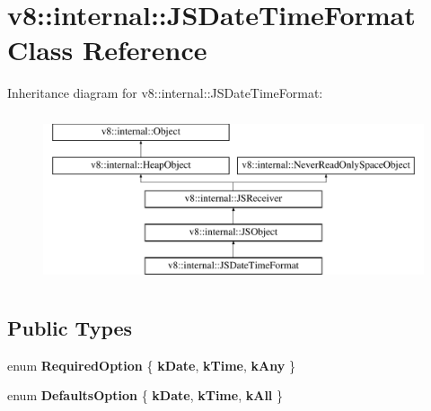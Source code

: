 \hypertarget{classv8_1_1internal_1_1JSDateTimeFormat}{}\section{v8\+:\+:internal\+:\+:J\+S\+Date\+Time\+Format Class Reference}
\label{classv8_1_1internal_1_1JSDateTimeFormat}
Inheritance diagram for v8\+:\+:internal\+:\+:J\+S\+Date\+Time\+Format\+:\begin{figure}[H]
\begin{center}
\leavevmode
\includegraphics[height=5.000000cm]{classv8_1_1internal_1_1JSDateTimeFormat}
\end{center}
\end{figure}
\subsection*{Public Types}
\begin{DoxyCompactItemize}
\item 
\mbox{\label{classv8_1_1internal_1_1JSDateTimeFormat_a79ab1e100fdbf1dfdd49f9db9b34ddb9}} 
enum {\bfseries Required\+Option} \{ {\bfseries k\+Date}, 
{\bfseries k\+Time}, 
{\bfseries k\+Any}
 \}
\item 
\mbox{\label{classv8_1_1internal_1_1JSDateTimeFormat_aa4f9b53f968ae87cb5b58c1d7c591309}} 
enum {\bfseries Defaults\+Option} \{ {\bfseries k\+Date}, 
{\bfseries k\+Time}, 
{\bfseries k\+All}
 \}
\end{DoxyCompactItemize}
